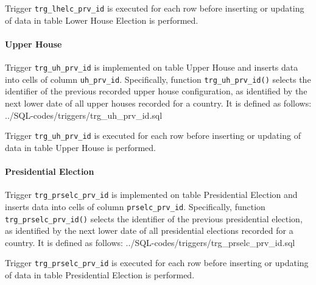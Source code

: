 Trigger \texttt{trg\_lhelc\_prv\_id} is executed for each row before inserting or updating of data in table Lower House Election is performed.  

\paragraph{Upper House}\label{trg_uh_prv_id}
Trigger \texttt{trg\_uh\_prv\_id} is implemented on table Upper House and inserts data into cells of column \texttt{uh\_prv\_id}. 
Specifically, function \texttt{trg\_uh\_prv\_id()}  selects the identifier of the previous recorded upper house configuration, as identified by the next lower date of all upper houses recorded for a country.
It is defined as follows:
%
{../SQL-codes/triggers/trg_uh_prv_id.sql}

Trigger \texttt{trg\_uh\_prv\_id} is executed for each row before inserting or updating of data in table Upper House is performed.

\paragraph{Presidential Election}\label{trg_prselc_prv_id}
Trigger \texttt{trg\_prselc\_prv\_id} is implemented on table Presidential Election and inserts data into cells of column \texttt{prselc\_prv\_id}. 
Specifically, function \texttt{trg\_prselc\_prv\_id()} selects the identifier of the previous presidential election, as identified by the next lower date of all presidential elections recorded for a country.
It is defined as follows:
%
{../SQL-codes/triggers/trg_prselc_prv_id.sql}

Trigger \texttt{trg\_prselc\_prv\_id} is executed for each row before inserting or updating of data in table Presidential Election is performed. 

